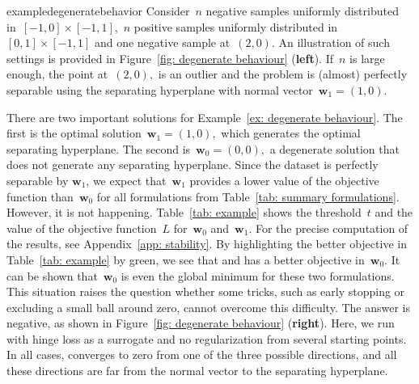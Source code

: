 \begin{restatable}{example}{degeneratebehavior}\label{ex: degenerate behaviour}
  Consider~$n$ negative samples uniformly distributed in~$[-1,0]\times[-1,1]$,~$n$ positive samples uniformly distributed in~$[0,1]\times[-1,1]$ and one negative sample at~$(2,0).$ An illustration of such settings is provided in Figure~\ref{fig: degenerate behaviour} (\textbf{left}). If~$n$ is large enough, the point at~$(2,0),$ is an outlier and the problem is (almost) perfectly separable using the separating hyperplane with normal vector~$\bm{w}_1 = (1, 0)$. 
\end{restatable}

There are two important solutions for Example~\ref{ex: degenerate behaviour}. The first is the optimal solution~$\bm{w}_1=(1,0),$ which generates the optimal separating hyperplane. The second is~$\bm{w}_0=(0,0),$ a degenerate solution that does not generate any separating hyperplane. Since the dataset is perfectly separable by $\bm{w}_1$, we expect that~$\bm{w}_1$ provides a lower value of the objective function than~$\bm{w}_0$ for all formulations from Table~\ref{tab: summary formulations}. However, it is not happening. Table~\ref{tab: example} shows the threshold~$t$ and the value of the objective function~$L$ for~$\bm{w}_0$ and~$\bm{w}_1.$ For the precise computation of the results, see Appendix~\ref{app: stability}. By highlighting the better objective in Table~\ref{tab: example} by green, we see that \TopPush and \TopMeanK has a better objective in~$\bm{w}_0.$ It can be shown that~$\bm{w}_0$ is even the global minimum for these two formulations. This situation raises the question whether some tricks, such as early stopping or excluding a small ball around zero, cannot overcome this difficulty. The answer is negative, as shown in Figure~\ref{fig: degenerate behaviour} (\textbf{right}). Here, we run \TopPush with hinge loss as a surrogate and no regularization from several starting points. In all cases, \TopPush converges to zero from one of the three possible directions, and all these directions are far from the normal vector to the separating hyperplane.


